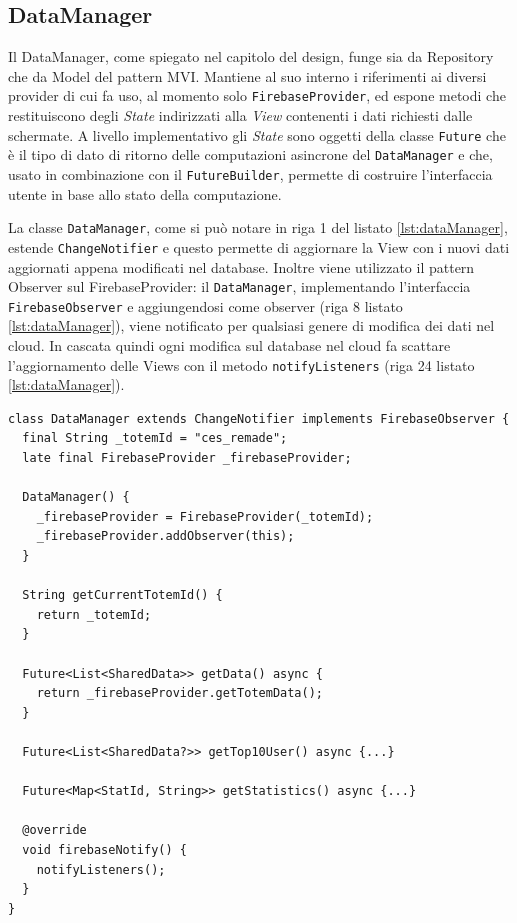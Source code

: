 \subsection{DataManager}
Il DataManager, come spiegato nel capitolo del design, funge sia da Repository che da Model del pattern MVI. Mantiene al suo interno i riferimenti ai diversi provider di cui fa uso, al momento solo \texttt{FirebaseProvider}, ed espone metodi che restituiscono degli \textit{State} indirizzati alla \textit{View} contenenti i dati richiesti dalle schermate. A livello implementativo gli \textit{State} sono oggetti della classe \texttt{Future} che è il tipo di dato di ritorno delle computazioni asincrone del \texttt{DataManager} e che, usato in combinazione con il \texttt{FutureBuilder}, permette di costruire l'interfaccia utente in base allo stato della computazione.

La classe \texttt{DataManager}, come si può notare in riga 1 del listato \ref{lst:dataManager}, estende \texttt{ChangeNotifier} e questo permette di aggiornare la View con i nuovi dati aggiornati appena modificati nel database.
Inoltre viene utilizzato il pattern Observer sul FirebaseProvider: il \texttt{DataManager}, implementando l'interfaccia \texttt{FirebaseObserver} e aggiungendosi come observer (riga 8 listato \ref{lst:dataManager}), viene notificato per qualsiasi genere di modifica dei dati nel cloud.
In cascata quindi ogni modifica sul database nel cloud fa scattare l'aggiornamento delle Views con il metodo \texttt{notifyListeners} (riga 24 listato \ref{lst:dataManager}).
\vspace{\baselineskip}
\begin{lstlisting}[style=FlutterStyle, caption={Classe DataManager}, label={lst:dataManager}]
class DataManager extends ChangeNotifier implements FirebaseObserver {
  final String _totemId = "ces_remade";
  late final FirebaseProvider _firebaseProvider;

  DataManager() {
    _firebaseProvider = FirebaseProvider(_totemId);
    _firebaseProvider.addObserver(this);
  }

  String getCurrentTotemId() {
    return _totemId;
  }

  Future<List<SharedData>> getData() async {
    return _firebaseProvider.getTotemData();
  }

  Future<List<SharedData?>> getTop10User() async {...}

  Future<Map<StatId, String>> getStatistics() async {...}

  @override
  void firebaseNotify() {
    notifyListeners(); 
  }
}
\end{lstlisting}
\newpage
